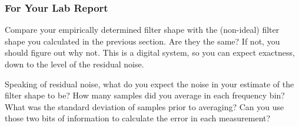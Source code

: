 \documentclass[11pt]{article}
\begin{document}
\subsubsection{For Your Lab Report}

Compare your empirically determined filter shape with the (non-ideal) filter shape you calculated in the previous section.
Are they the same?  If not, you should figure out why not.  This is a digital system, so you can expect exactness, down to the
level of the residual noise.

Speaking of residual noise, what do you expect the noise in your estimate of the filter shape to be?  How many samples did you
average in each frequency bin?  What was the standard deviation of samples prior to averaging?  Can you use those two bits
of information to calculate the error in each measurement?
\end{document}
